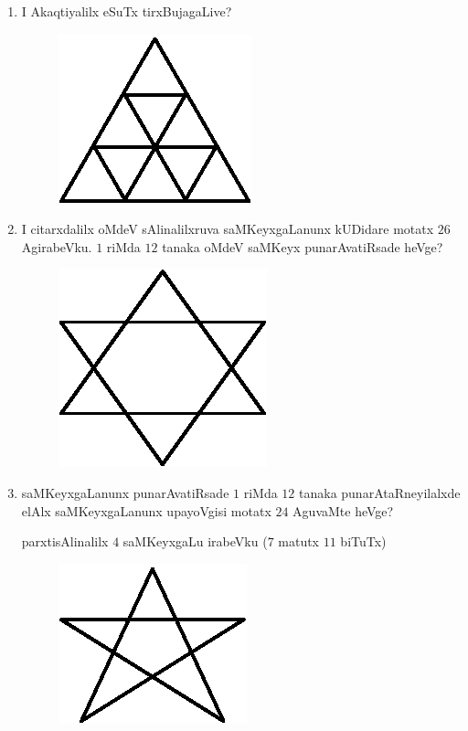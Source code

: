 \begin{enumerate}
\newpage

\item I Akaqtiyalilx eSuTx tirxBujagaLive?
\begin{figure}[H]
\centering
\includegraphics[scale=0.9]{src/figures/exr22.eps}
\end{figure}

\item I citarxdalilx oMdeV sAlinalilxruva saMKeyxgaLanunx kUDidare motatx $26$ AgirabeVku. $1$ riMda $12$ tanaka oMdeV saMKeyx punarAvatiRsade heVge?
\begin{figure}[H]
\centering
\includegraphics[scale=0.9]{src/figures/exr23.eps}
\end{figure}

\item saMKeyxgaLanunx punarAvatiRsade $1$ riMda $12$ tanaka punarAtaRneyilalxde elAlx saMKeyxgaLanunx upayoVgisi motatx $24$ AguvaMte heVge?

parxtisAlinalilx $4$ saMKeyxgaLu irabeVku ($7$ matutx $11$ biTuTx)
\begin{figure}[H]
\centering
\includegraphics[scale=0.9]{src/figures/exr24.eps}
\end{figure}


\end{enumerate}
